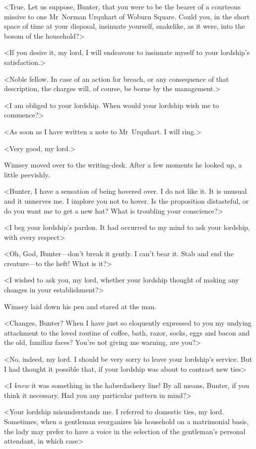 <True. Let us suppose, Bunter, that you were to be the bearer of a courteous missive to one Mr~Norman Urquhart of Woburn Square. Could you, in the short space of time at your disposal, insinuate yourself, snakelike, as it were, into the bosom of the household?>

<If you desire it, my lord, I will endeavour to insinuate myself to your lordship's satisfaction.>

<Noble fellow. In case of an action for breach, or any consequence of that description, the charges will, of course, be borne by the management.>

<I am obliged to your lordship. When would your lordship wish me to commence?>

<As soon as I have written a note to Mr~Urquhart. I will ring.>

<Very good, my lord.>

Wimsey moved over to the writing-desk. After a few moments he looked up, a little peevishly.

<Bunter, I have a sensation of being hovered over. I do not like it. It is unusual and it unnerves me. I implore you not to hover. Is the proposition distasteful, or do you want me to get a new hat? What is troubling your conscience?>

<I beg your lordship's pardon. It had occurred to my mind to ask your lordship, with every respect\longdash>

<Oh, God, Bunter—don't break it gently. I can't bear it. Stab and end the creature—to the heft! What is it?>

<I wished to ask you, my lord, whether your lordship thought of making any changes in your establishment?>

Wimsey laid down his pen and stared at the man.

<Changes, Bunter? When I have just so eloquently expressed to you my undying attachment to the loved routine of coffee, bath, razor, socks, eggs and bacon and the old, familiar faces? You're not giving me warning, are you?>

<No, indeed, my lord. I should be very sorry to leave your lordship's service. But I had thought it possible that, if your lordship was about to contract new ties\longdash>

<I \emph{knew} it was something in the haberdashery line! By all means, Bunter, if you think it necessary. Had you any particular pattern in mind?>

<Your lordship misunderstands me. I referred to domestic ties, my lord. Sometimes, when a gentleman reorganizes his household on a matrimonial basis, the lady may prefer to have a voice in the selection of the gentleman's personal attendant, in which case\longdash>

